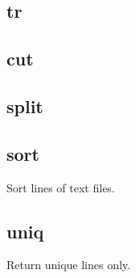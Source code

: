 
\subsection{tr}

\subsection{cut}

\subsection{split}

\subsection{sort}

Sort lines of text files.

\subsection{uniq}

Return unique lines only.
